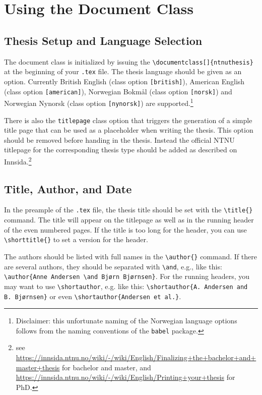 \chapter{Using the Document Class}
\label{chap:usage}

\section{Thesis Setup and Language Selection}
\label{sec:setup}

The document class is initialized by issuing the \texttt{\textbackslash documentclass[]\{ntnuthesis\}} at the beginning of your \texttt{.tex} file. The thesis language should be given as an option. Currently British English (class option \texttt{[british]}), American English (class option \texttt{[american]}), Norwegian Bokmål (class option \texttt{[norsk]}) and Norwegian Nynorsk (class option \texttt{[nynorsk]}) are supported.\footnote{Disclaimer: this unfortunate naming of the Norwegian language options follows from the naming conventions of the \texttt{babel} package.}

There is also the \texttt{titlepage} class option that triggers the generation of a simple title page that can be used as a placeholder when writing the thesis. This option should be removed before handing in the thesis. Instead the official NTNU titlepage for the corresponding thesis type should be added as described on Innsida.\footnote{see \url{https://innsida.ntnu.no/wiki/-/wiki/English/Finalizing+the+bachelor+and+master+thesis} for bachelor and master, and \url{https://innsida.ntnu.no/wiki/-/wiki/English/Printing+your+thesis} for PhD.}

\section{Title, Author, and Date}

In the preample of the \texttt{.tex} file, the thesis title should be set with the \texttt{\textbackslash title\{\}} command. The title will appear on the titlepage as well as in the running header of the even numbered pages. If the title is too long for the header, you can use \texttt{\textbackslash shorttitle\{\}} to set a version for the header.

The authors should be listed with full names in the \texttt{\textbackslash author\{\}} command. If there are several authors, they should be separated with \texttt{\textbackslash and}, e.g., like this: \texttt{\textbackslash author\{Anne Andersen \textbackslash and Bjørn Bjørnsen\}}. For the running headers, you may want to use \texttt{\textbackslash shortauthor}, e.g. like this: \texttt{\textbackslash shortauthor\{A. Andersen and B. Bjørnsen\}} or even \texttt{\textbackslash shortauthor\{Andersen et al.\}}.

